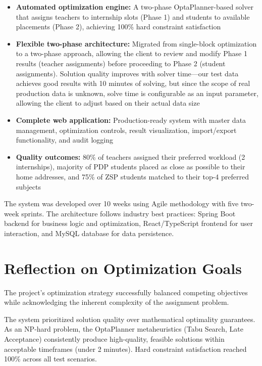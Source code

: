 \documentclass[12pt,a4paper]{report}
\begin{document}
\begin{itemize}
    \item \textbf{Automated optimization engine:} A two-phase OptaPlanner-based solver that assigns teachers to internship slots (Phase 1) and students to available placements (Phase 2), achieving 100\% hard constraint satisfaction
    
    \item \textbf{Flexible two-phase architecture:} Migrated from single-block optimization to a two-phase approach, allowing the client to review and modify Phase 1 results (teacher assignments) before proceeding to Phase 2 (student assignments). Solution quality improves with solver time—our test data achieves good results with 10 minutes of solving, but since the scope of real production data is unknown, solve time is configurable as an input parameter, allowing the client to adjust based on their actual data size
    
    \item \textbf{Complete web application:} Production-ready system with master data management, optimization controls, result visualization, import/export functionality, and audit logging
    
    \item \textbf{Quality outcomes:} 80\% of teachers assigned their preferred workload (2 internships), majority of PDP students placed as close as possible to their home addresses, and 75\% of ZSP students matched to their top-4 preferred subjects
\end{itemize}

The system was developed over 10 weeks using Agile methodology with five two-week sprints. The architecture follows industry best practices: Spring Boot backend for business logic and optimization, React/TypeScript frontend for user interaction, and MySQL database for data persistence.

\section{Reflection on Optimization Goals}

The project's optimization strategy successfully balanced competing objectives while acknowledging the inherent complexity of the assignment problem.

The system prioritized solution quality over mathematical optimality guarantees. As an NP-hard problem, the OptaPlanner metaheuristics (Tabu Search, Late Acceptance) consistently produce high-quality, feasible solutions within acceptable timeframes (under 2 minutes). Hard constraint satisfaction reached 100\% across all test scenarios.
\end{document}
